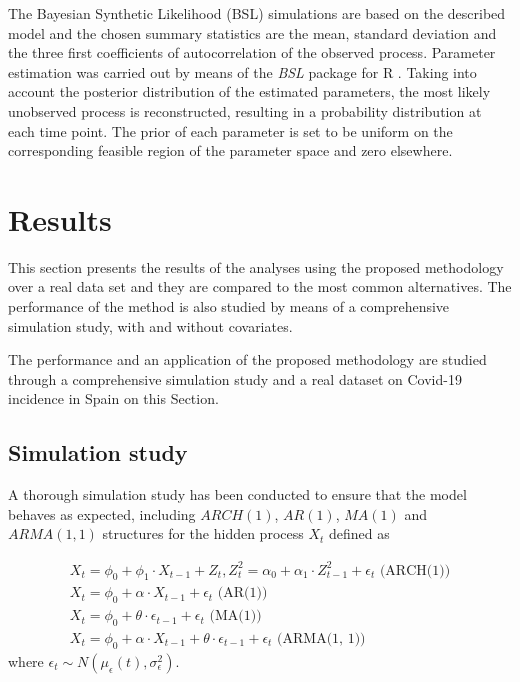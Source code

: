 \documentclass{bmcart}
\begin{document}
The Bayesian Synthetic Likelihood (BSL) simulations are based on the described model and the chosen summary statistics are the mean, standard deviation and the three first coefficients of autocorrelation of the observed process. Parameter estimation was carried out by means of the \textit{BSL} \cite{BSLManual,An2019} package for R \cite{RCoreTeam2019}. Taking into account the posterior distribution of the estimated parameters, the most likely unobserved process is reconstructed, resulting in a probability distribution at each time point. The prior of each parameter is set to be uniform on the corresponding feasible region of the parameter space and zero elsewhere.

\section*{Results}\label{results}
This section presents the results of the analyses using the proposed methodology over a real data set and they are compared to the most common alternatives. The performance of the method is also studied by means of a comprehensive simulation study, with and without covariates.

The performance and an application of the proposed methodology are studied through a comprehensive simulation study and a real dataset on Covid-19 incidence in Spain on this Section.

\subsection*{Simulation study}\label{sim}
A thorough simulation study has been conducted to ensure that the model behaves as expected, including $ARCH(1)$, $AR(1)$, $MA(1)$ and $ARMA(1, 1)$ structures for the hidden process $X_t$ defined as

\begin{equation}\begin{array}{c}
  X_t = \phi_0 + \phi_1 \cdot X_{t-1} + Z_t, Z^2_t=\alpha_0+\alpha_1 \cdot Z^2_{t-1} + \epsilon_t \text{ (ARCH(1))} \\
  X_t = \phi_0 + \alpha \cdot X_{t-1} + \epsilon_t \text{ (AR(1))} \\
  X_t = \phi_0 + \theta \cdot \epsilon_{t-1} + \epsilon_t \text{ (MA(1))} \\
  X_t = \phi_0 + \alpha \cdot X_{t-1} + \theta \cdot \epsilon_{t-1} + \epsilon_t \text{ (ARMA(1, 1))}
\end{array}\end{equation}
where $\epsilon_t \sim N(\mu_{\epsilon}(t), \sigma_{\epsilon}^2)$.
\end{document}
